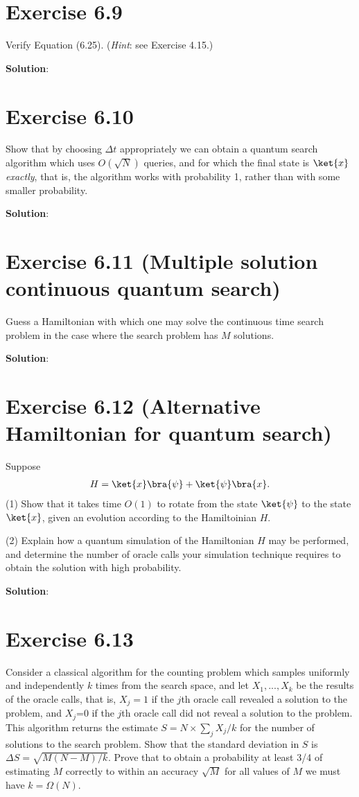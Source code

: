 \documentclass{book}
\begin{document}
\section*{Exercise 6.9}
    Verify Equation (6.25). (\emph{Hint}: see Exercise 4.15.)
    
    \textbf{Solution}:

\section*{Exercise 6.10}
    Show that by choosing $\Delta t$ appropriately we can obtain a quantum
    search algorithm which uses $O(\sqrt{N})$ queries, and for which the final state is $\ket{x}$ \emph{exactly}, that is, the algorithm works with probability 1, rather than with some smaller probability.
    
    \textbf{Solution}:

\section*{Exercise 6.11 (Multiple solution continuous quantum search)}
    Guess a Hamiltonian with which one may solve the continuous time search problem in the case where the search problem has $M$ solutions.
    
    \textbf{Solution}:

\section*{Exercise 6.12 (Alternative Hamiltonian for quantum search)}
    Suppose
    \begin{align}
        H = \ket{x}\bra{\psi}+\ket{\psi}\bra{x}.
    \end{align}
    (1) Show that it takes time $O(1)$ to rotate from the state $\ket{\psi}$ to the state $\ket{x}$, given an evolution according to the Hamiltoinian $H$. \par
    (2) Explain how a quantum simulation of the Hamiltonian $H$ may be performed, and determine the number of oracle calls your simulation technique requires to obtain the solution with high probability.
        
    \textbf{Solution}:
    
\section*{Exercise 6.13}
    Consider a classical algorithm for the counting problem which samples uniformly and independently $k$ times from the search space, and let $X_1, ..., X_k$ be the results of the oracle calls, that is, $X_j = 1$ if the $j$th oracle call revealed a solution to the problem, and $X_j$=0 if the $j$th oracle call did not reveal a solution to the problem. This algorithm returns the estimate $S = N\times \sum_j X_j/k$ for the number of solutions to the search problem. Show that the standard deviation in $S$ is $\Delta S = \sqrt{M(N-M)/k}$. Prove that to obtain a probability at least 3/4 of estimating $M$ correctly to within an accuracy $\sqrt{M}$ for all values of $M$ we must have $k = \Omega(N)$.
    
\end{document}
